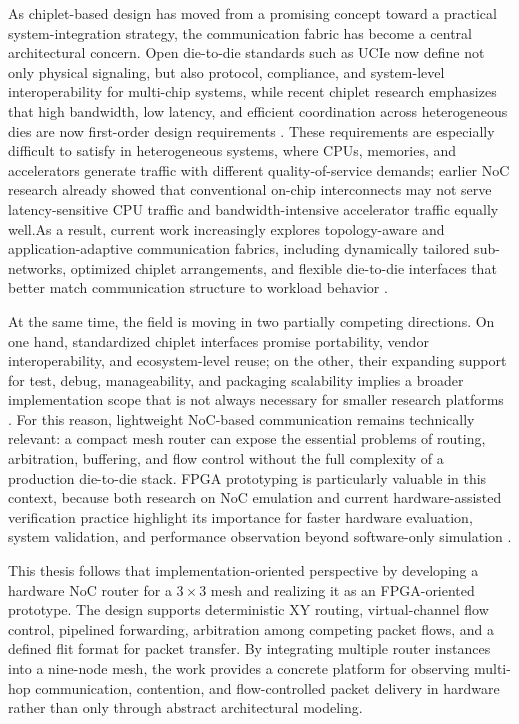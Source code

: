 As chiplet-based design has moved from a promising concept toward a practical system-integration strategy, the communication fabric has become a central architectural concern. Open die-to-die standards such as UCIe now define not only physical signaling, but also protocol, compliance, and system-level interoperability for multi-chip systems, while recent chiplet research emphasizes that high bandwidth, low latency, and efficient coordination across heterogeneous dies are now first-order design requirements \cite{9773184}. These requirements are especially difficult to satisfy in heterogeneous systems, where CPUs, memories, and accelerators generate traffic with different quality-of-service demands; earlier NoC research already showed that conventional on-chip interconnects may not serve latency-sensitive CPU traffic and bandwidth-intensive accelerator traffic equally well.As a result, current work increasingly explores topology-aware and application-adaptive communication fabrics, including dynamically tailored sub-networks, optimized chiplet arrangements, and flexible die-to-die interfaces that better match communication structure to workload behavior \cite{chen2024surveychipletbasedintegratedarchitecture}. 

At the same time, the field is moving in two partially competing directions. On one hand, standardized chiplet interfaces promise portability, vendor interoperability, and ecosystem-level reuse; on the other, their expanding support for test, debug, manageability, and packaging scalability implies a broader implementation scope that is not always necessary for smaller research platforms \cite{9773184}. For this reason, lightweight NoC-based communication remains technically relevant: a compact mesh router can expose the essential problems of routing, arbitration, buffering, and flow control without the full complexity of a production die-to-die stack. FPGA prototyping is particularly valuable in this context, because both research on NoC emulation and current hardware-assisted verification practice highlight its importance for faster hardware evaluation, system validation, and performance observation beyond software-only simulation \cite{10035152}.

This thesis follows that implementation-oriented perspective by developing a hardware NoC router for a $3 \times 3$ mesh and realizing it as an FPGA-oriented prototype. The design supports deterministic XY routing, virtual-channel flow control, pipelined forwarding, arbitration among competing packet flows, and a defined flit format for packet transfer. By integrating multiple router instances into a nine-node mesh, the work provides a concrete platform for observing multi-hop communication, contention, and flow-controlled packet delivery in hardware rather than only through abstract architectural modeling.
